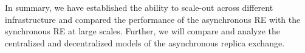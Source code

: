 \documentclass[a4paper,10pt]{article}
\newcommand{\jhanote}[1]{ {\textcolor{red} { ***shantenu: #1 }}}
\newcommand{\athotanote}[1]{ {\textcolor{green} { ***athota: #1 }}}
\newcommand{\jhanote}[1]{}
\newcommand{\athotanote}[1]{}
\begin{document}
In summary, we have established the ability to scale-out across different
infrastructure and compared the performance of the asynchronous
RE with the synchronous RE at large scales. Further, we will
compare and analyze the centralized and decentralized models of the asynchronous
replica exchange.


 
  
 
\end{document}
